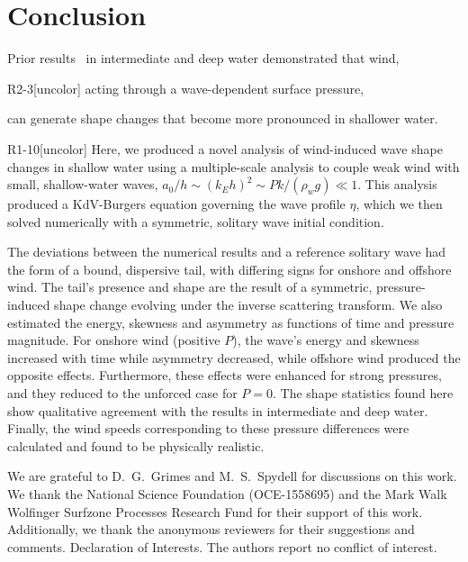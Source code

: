 \documentclass{jfm}
\begin{document}
\section{\label{sec:conclusion} Conclusion}
Prior results~\citep{zdyrski2020wind} in intermediate and deep water
demonstrated that wind,
\begin{LineLabel}{R2-3}[uncolor]
acting through a wave-dependent surface pressure,
\end{LineLabel}
can generate shape changes that become more pronounced in
shallower water.
\begin{LineLabel}{R1-10}[uncolor]
Here, we produced a novel analysis of wind-induced wave shape changes in
shallow water using a multiple-scale analysis to couple weak wind with
small, shallow-water waves, \ie{} $a_0/h \sim (k_E h)^2 \sim P k/(\rho_w
g) \ll 1$.
This analysis produced a KdV-Burgers equation governing the wave profile
$\eta$, which we then solved numerically with a symmetric, solitary wave
initial condition.
\end{LineLabel}
The deviations between the numerical results and a reference solitary
wave had the form of a bound, dispersive tail, with differing signs for
onshore and offshore wind.
The tail's presence and shape are the result of a symmetric,
pressure-induced shape change evolving under the inverse scattering
transform.
We also estimated the energy, skewness and
asymmetry as functions of time and pressure magnitude.
For onshore wind (positive $P$), the wave's energy and skewness
increased with time while asymmetry decreased, while offshore wind
produced the opposite effects.
Furthermore, these effects were enhanced for strong pressures, and they
reduced to the unforced case for $P=0$.
The shape statistics found here show qualitative agreement with the
results in intermediate and deep water.
Finally, the wind speeds corresponding to these pressure differences
were calculated and found to be physically realistic.

\begin{acknowledgements}
We are grateful to D.~G.~Grimes and M.~S.~Spydell for discussions on
this work.
We thank the National Science Foundation (OCE-1558695) and the Mark Walk
Wolfinger Surfzone Processes Research Fund for their support of this
work.
Additionally, we thank the anonymous reviewers for their suggestions and
comments.
Declaration of Interests. The authors report no conflict of interest.
\end{acknowledgements}



\end{document}
